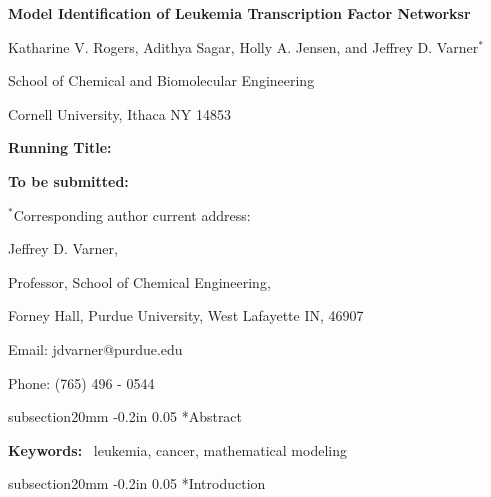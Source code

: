 \documentclass[12pt]{article}
\makeatletter
\renewcommand\section{\@startsection
	{subsection}{2}{0mm}
	{-0.2in}
	{0.05\baselineskip}
	{\normalfont\large\bfseries}}
\makeatother
\begin{document}
\begin{titlepage}
{\par\centering\textbf{\Large Model Identification of Leukemia Transcription Factor Networksr}}
\vspace{0.05in}
{\par \centering \large{ Katharine V. Rogers, Adithya Sagar, Holly A. Jensen,
and Jeffrey D. Varner$^{*}$}}
\vspace{0.10in}
{\par \centering \large{School of Chemical and Biomolecular Engineering}}
{\par \centering \large{Cornell University, Ithaca NY 14853}}
\vspace{0.1in}
{\par \centering \textbf{Running Title:}~}
\vspace{0.1in}
{\par \centering \textbf{To be submitted:}~\emph{}}
\vspace{0.5in}
{\par \centering $^{*}$Corresponding author current address:}
{\par \centering Jeffrey D. Varner,}
{\par \centering Professor, School of Chemical Engineering,}
{\par {} Forney Hall, Purdue University, West Lafayette IN, 46907}
{\par \centering Email: jdvarner@purdue.edu}
{\par \centering Phone: (765) 496 - 0544}
\end{titlepage}
\date{}
\thispagestyle{empty}
\pagebreak
\section*{Abstract}


\vspace{0.5in}
{\noindent \textbf{Keywords:}~ leukemia, cancer, mathematical modeling}

\pagebreak

\setcounter{page}{1}

\linenumbers

\section*{Introduction}
\end{document}
